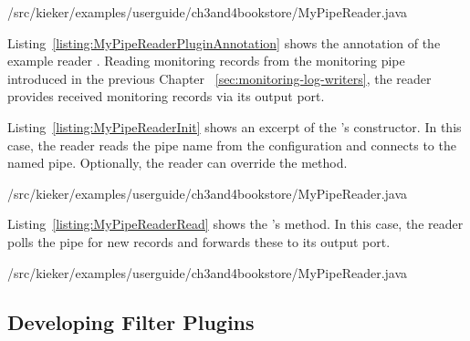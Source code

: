 % 

\enlargethispage{1cm}

\setJavaCodeListing
%
{\customComponentsBookstoreApplicationDir/src/kieker/examples/userguide/ch3and4bookstore/MyPipeReader.java}

Listing~\ref{listing:MyPipeReaderPluginAnnotation} shows the  %
annotation  of the example reader . Reading monitoring %
records from the monitoring pipe introduced in the previous Chapter~%
\ref{sec:monitoring-log-writers}, the reader provides received monitoring %
records via its output port.

\noindent Listing~\ref{listing:MyPipeReaderInit} shows an excerpt of the 's %
constructor. In this case, the reader reads the pipe name from the %
configuration and connects to the named pipe. Optionally, the reader can override the 
 method.

 \pagebreak

\setJavaCodeListing
%
{\customComponentsBookstoreApplicationDir/src/kieker/examples/userguide/ch3and4bookstore/MyPipeReader.java}


\noindent Listing~\ref{listing:MyPipeReaderRead} shows the 's %
 method. In this case, the reader polls the pipe for new records %
and forwards these to its output port.

\setJavaCodeListing
%
{\customComponentsBookstoreApplicationDir/src/kieker/examples/userguide/ch3and4bookstore/MyPipeReader.java}

\vspace{-0.2cm}

\subsection{Developing Filter Plugins}\label{sec:analysis:filters}

